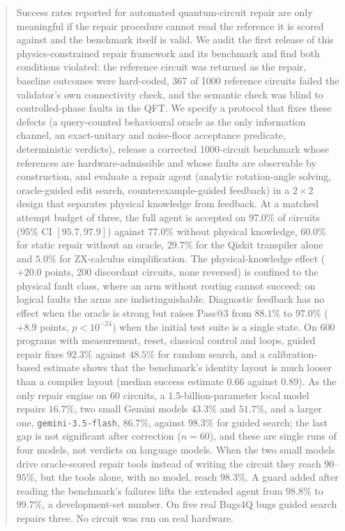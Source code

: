 \documentclass[journal]{IEEEtran}
\begin{document}
\begin{abstract}
Success rates reported for automated quantum-circuit repair are only meaningful
if the repair procedure cannot read the reference it is scored against and the
benchmark itself is valid. We audit the first release of this physics-constrained
repair framework and its benchmark and find both conditions violated: the reference
circuit was returned as the repair, baseline outcomes were hard-coded, 367 of
1000 reference circuits failed the validator's own connectivity check, and the
semantic check was blind to controlled-phase faults in the QFT. We specify a
protocol that fixes these defects (a query-counted behavioural oracle as the only
information channel, an exact-unitary and noise-floor acceptance predicate,
deterministic verdicts), release a corrected 1000-circuit benchmark whose
references are hardware-admissible and whose faults are observable by
construction, and evaluate a repair agent (analytic rotation-angle solving,
oracle-guided edit search, counterexample-guided feedback) in a $2\times2$
design that separates physical knowledge from feedback. At a matched attempt
budget of three, the full agent is accepted on $97.0\%$ of circuits (95\% CI
$[95.7,97.9]$) against $77.0\%$ without physical knowledge, $60.0\%$ for static
repair without an oracle, $29.7\%$ for the Qiskit transpiler alone and $5.0\%$ for
ZX-calculus simplification. The
physical-knowledge effect ($+20.0$ points, 200 discordant circuits, none
reversed) is confined to the physical fault class, where an arm without routing
cannot succeed; on logical faults the arms are indistinguishable. Diagnostic
feedback has no effect when the oracle is strong but raises Pass@3 from $88.1\%$
to $97.0\%$ ($+8.9$ points, $p<10^{-24}$) when the initial test suite is a single
state. On 600 programs with measurement, reset, classical control and loops, guided repair
fixes $92.3\%$ against $48.5\%$ for random search, and a calibration-based estimate shows that
the benchmark's identity layout is much looser than a compiler layout (median success
estimate $0.66$ against $0.89$). As the only repair engine on 60 circuits, a 1.5-billion-parameter local model
repairs $16.7\%$, two small Gemini models $43.3\%$ and $51.7\%$, and a larger one, \texttt{gemini-3.5-flash}, $86.7\%$,
against $98.3\%$ for guided search; the last gap is not significant after correction ($n=60$), and these are single runs of four
models, not verdicts on language models. When the two small models drive oracle-scored repair tools
instead of writing the circuit they reach $90$--$95\%$, but the tools alone, with no model, reach $98.3\%$. A guard added after reading the benchmark's failures lifts the extended agent from $98.8\%$ to $99.7\%$, a development-set
number. On five real Bugs4Q bugs guided search repairs three.
No circuit was run on real hardware.
\end{abstract}
\end{document}
